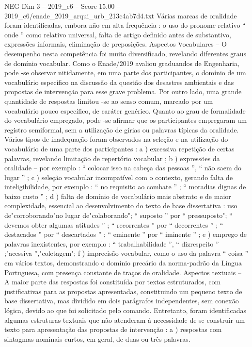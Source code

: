 \begin{textsample}{NEG Dim 3 – 2019\_c6 – Score 15.00 – 2019\_c6/enade\_2019\_arqui\_urb\_213c4ab7d4.txt}
Várias marcas de oralidade foram identificadas, embora não em alta frequência : o uso do pronome relativo “ onde ” como relativo universal, falta de artigo definido antes de substantivo, expressões informais, eliminação de preposições.
Aspectos Vocabulares – O desempenho nesta competência foi muito diversificado, revelando diferentes graus de domínio vocabular.
Como o Enade/2019 avaliou graduandos de Engenharia, pode -se observar nitidamente, em uma parte dos participantes, o domínio de um vocabulário específico na discussão da questão dos desastres ambientais e das propostas de intervenção para esse grave problema.
Por outro lado, uma grande quantidade de respostas limitou -se ao senso comum, marcado por um vocabulário pouco específico, de caráter genérico.
Quanto ao grau de formalidade do vocabulário empregado, pode -se afirmar que os participantes empregaram um registro semiformal, sem a utilização de gírias ou palavras típicas da oralidade.
Vários tipos de inadequação foram observados na seleção e na utilização do vocabulário de uma parte dos participantes : a ) excessiva repetição de certas palavras, revelando limitação de repertório vocabular ; b ) expressões da oralidade – por exemplo : “ colocar isso na cabeça das pessoas ”, “ não saem do lugar ” ; c ) seleção vocabular incompatível com o contexto, gerando falta de inteligibilidade, por exemplo : “ no requisito ao combate ” ; “ moradias dignas de baixo custo ” ; d ) falta de domínio de vocabulário mais abstrato e de maior complexidade, essencial ao desenvolvimento do texto de base dissertativa : uso de"corroborando"no lugar de"colaborando"; “ suposto ” por “ pressuposto"; “ devemos obter algumas atitudes ” ; “ recorrentes ” por “ decorrentes ” ; “ destacados ” por “ descartados ” ; “ eminente ” por “ iminente ” ; e ) emprego de palavras inexistentes, por exemplo : “ trabalhabilidade ”, “ dizrespeito ” ;"acessiva ”,"coletagem"; f ) imprecisão vocabular, como o uso da palavra “ coisa ” em vários textos, demonstrando o domínio precário da norma-padrão da Língua Portuguesa, com presença constante de traços de oralidade.
Aspectos textuais – A maior parte das respostas foi constituída por textos estruturados, com justificativas para as propostas apresentadas, constituindo um pequeno texto de base dissertativa, mas dividido em dois parágrafos independentes, sem conexão lógica, devido ao que foi solicitado pelo comando.
Entretanto, foram identificadas algumas estruturas textuais que não atenderam à necessidade de se construir um texto para apresentação das propostas de intervenção : a ) respostas com sintagmas nominais curtos, em geral, de duas ou três palavras.

\end{textsample}
